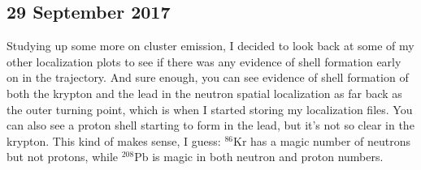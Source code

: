 \documentclass[]{report}
\begin{document}
\subsection*{29 September 2017}
Studying up some more on cluster emission, I decided to look back at some of my other localization plots to see if there was any evidence of shell formation early on in the trajectory. And sure enough, you can see evidence of shell formation of both the krypton and the lead in the neutron spatial localization as far back as the outer turning point, which is when I started storing my localization files. You can also see a proton shell starting to form in the lead, but it's not so clear in the krypton. This kind of makes sense, I guess: $^{86}$Kr has a magic number of neutrons but not protons, while $^{208}$Pb is magic in both neutron and proton numbers.
\end{document}
